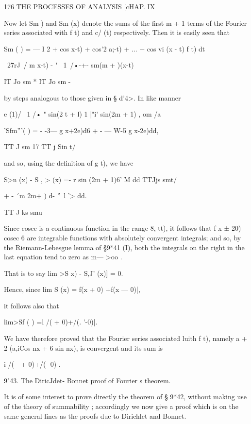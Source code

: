 176 THE PROCESSES OF ANALYSIS [cHAP. IX 

Now let Sm  ) and Sm   (x) denote the sums of the first m + 1 terms of 
the Fourier series associated with f t) and c/ (t) respectively. Then it is 
easily seen that 

Sm ( ) = — I  2 + cos  x-t) + cos'2 a;-t) + ... + cos vi (x - t)  f t) dt 

~27rJ\ /  m  x-t) -  "  
\ 1\  /•-+- sm(m +  )(x-t) 

IT Jo sm  *    IT Jo sm   -    

by steps analogous to those given in § d'4>. 
In like manner 

e (1)/ \ 1 /• " sin(2 t + l)   1 |"i' sin(2m + 1)  , om /a 

'Sfm'''( ) = - -3—  g x+2e)d6 + - — W-5 g x-2e)dd, 

TT J sm 17 TT j Sin t/ 

and so, using the definition of g  t), we have 

S>n (x) - S , > (x) =- r sin (2m + 1)6' M  dd 
TTJjs smt/ 

+ - \'\ m 2m+ ) d-  ''~l '> dd. 

TT J ks smu 



Since cosec   is a continuous function in the range   8,  tt), it follows that 
f x ± 20) cosec 6 are integrable functions with absolutely convergent integrals; 
and so, by the Riemann-Lebesgue lemma of §9*41 (I), both the integrals on the 
right in the last equation tend to zero as m— >oo . 

That is to say lim  >S   x) - S,J'  (x)] = 0. 

Hence, since lim S   (x) =    f(x + 0) +f(x — 0)|, 

it follows also that 

lim>Sf ( ) =l /(  + 0)+/(. '-0)|. 

We have therefore proved that the Fourier series associated luith f t), 
namely  a  + 2 (a,iCos nx + 6  sin nx), is convergent and its sum is 

i /( - + 0)+/( -0) . 

9"43. The DiricJdet- Bonnet proof of Fourier s theorem. 

It is of some interest to prove directly the theorem of § 9*42, without 
making use of the theory of summability ; accordingly we now give a proof 
which is on the same general lines as the proofs due to Dirichlet and Bonnet. 



